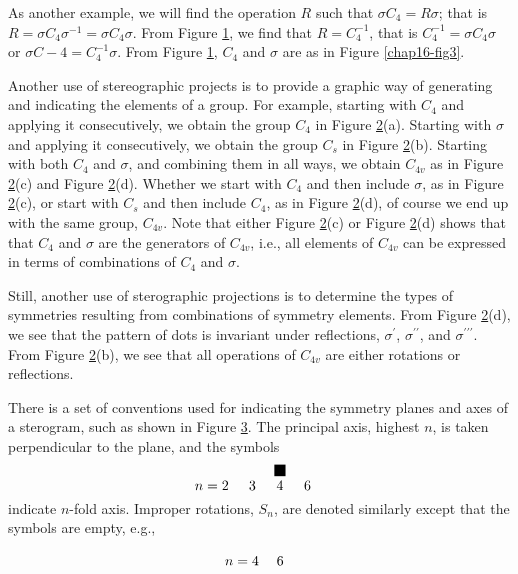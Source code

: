 As another example, we will find the operation $R$ such that $\sigma
C_4 = R \sigma$; that is $R = \sigma C_4 \sigma^{-1} = \sigma C_4
\sigma$.  From Figure \ref{chap16-fig10}, we find that $R = C_4^{-1}$,
that is $C^{-1}_4 = \sigma C_4 \sigma$ or $\sigma C-4 = C_4^{-1}
\sigma$.  From Figure \ref{chap16-fig10}, $C_4$ and $\sigma$ are as in
Figure \ref{chap16-fig3}.

\begin{figure}
\caption{}
\label{chap16-fig10}
\end{figure}

Another use of stereographic projects is to provide a graphic way of
generating and indicating the elements of a group.  For example,
starting with $C_4$ and applying it consecutively, we obtain the group
$C_4$ in Figure \ref{chap16-fig11}(a).  Starting with $\sigma$ and
applying it consecutively, we obtain the group $C_s$ in Figure
\ref{chap16-fig11}(b).  Starting with both $C_4$ and $\sigma$, and
combining them in all ways, we obtain $C_{4v}$ as in Figure
\ref{chap16-fig11}(c) and Figure \ref{chap16-fig11}(d).  Whether we
start with $C_4$ and then include $\sigma$, as in Figure
\ref{chap16-fig11}(c), or start with $C_s$ and then include $C_4$, as
in Figure \ref{chap16-fig11}(d), of course we end up with the same
group, $C_{4v}$.  Note that either Figure \ref{chap16-fig11}(c) or
Figure \ref{chap16-fig11}(d) shows that that $C_4$ and $\sigma$ are
the generators of $C_{4v}$, i.e., all elements of $C_{4v}$ can be
expressed in terms of combinations of $C_4$ and $\sigma$.

\begin{figure}
\caption{}
\label{chap16-fig11}
\end{figure}

Still, another use of sterographic projections is to determine the
types of symmetries resulting from combinations of symmetry elements.
From Figure \ref{chap16-fig11}(d), we see that the pattern of dots is
invariant under reflections, $\sigma^{\prime}$, $\sigma^{\prime
\prime}$, and $\sigma^{\prime \prime \prime}$.  From Figure
\ref{chap16-fig11}(b), we see that all operations of $C_{4v}$ are
either rotations or reflections.

\begin{figure}
\caption{}
\label{chap16-fig12}
\end{figure}

There is a set of conventions used for indicating the symmetry planes 
and axes of a sterogram, such as shown in Figure \ref{chap16-fig12}.
The principal axis, highest $n$, is taken perpendicular to the plane, 
and the symbols
\begin{equation}
{~~~~~~~~ \atop n=2} {~~~~~~~~ \atop 3} {\vrule height4pt width8pt 
depth4pt \atop 4} {~~~~~~~~ \atop 6}
\label{chap16-eqno10}
\end{equation}
indicate $n$-fold axis.  Improper rotations, $S_n$, are denoted 
similarly except that the symbols are empty, e.g.,
\begin{equation}
{~~~~~~~~ \atop n=4} {~~~~~~~ \atop 6}
\label{chap16-eqno11}
\end{equation}

